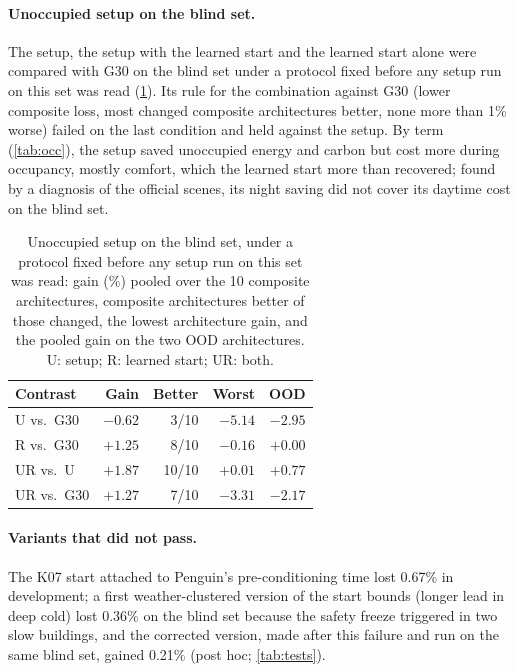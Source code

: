\paragraph{Unoccupied setup on the blind set.} The setup, the setup with the learned start and the learned start alone were
compared with G30 on the blind set under a protocol fixed before any setup run on this set was read (\cref{tab:unsblind}).
Its rule for the combination against G30 (lower composite loss, most changed composite architectures better, none more
than 1\% worse) failed on the last condition and held against the setup. By term (\cref{tab:occ}), the setup saved
unoccupied energy and carbon but cost more during occupancy, mostly comfort, which the learned start more than recovered;
found by a diagnosis of the official scenes, its night saving did not cover its daytime cost on the blind set.
\begin{table}[!htbp]
\centering
\caption{Unoccupied setup on the blind set, under a protocol fixed before any setup run on this set was read: gain (\%) pooled
over the 10 composite architectures, composite architectures better of those changed, the lowest architecture gain, and the
pooled gain on the two OOD architectures. U: setup; R: learned start; UR: both.}
\label{tab:unsblind}
\small
\begin{tabular}{lrrrr}
\toprule
Contrast & Gain & Better & Worst & OOD\\
\midrule
U vs.\ G30 & $-0.62$ & 3/10 & $-5.14$ & $-2.95$\\
R vs.\ G30 & $+1.25$ & 8/10 & $-0.16$ & $+0.00$\\
UR vs.\ U & $+1.87$ & 10/10 & $+0.01$ & $+0.77$\\
UR vs.\ G30 & $+1.27$ & 7/10 & $-3.31$ & $-2.17$\\
\bottomrule
\end{tabular}
\end{table}

\paragraph{Variants that did not pass.} The K07 start attached to Penguin's pre-conditioning time lost 0.67\% in development; a first weather-clustered version of the start bounds (longer lead in deep cold) lost 0.36\% on the blind set because the safety freeze triggered in two slow buildings, and the corrected version, made after this failure and run on the same blind set, gained 0.21\% (post hoc;
\cref{tab:tests}).

